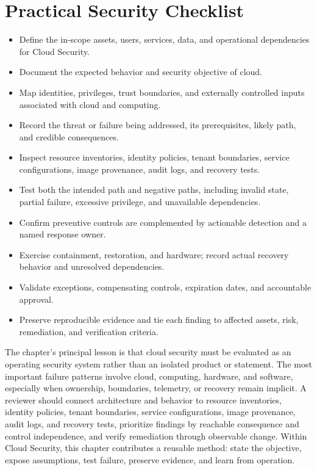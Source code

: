 \documentclass[11pt]{article}
\begin{document}
\section*{Practical Security Checklist}
\begin{itemize}[label=$\square$]
\item Define the in-scope assets, users, services, data, and operational dependencies for Cloud Security.
\item Document the expected behavior and security objective of cloud.
\item Map identities, privileges, trust boundaries, and externally controlled inputs associated with cloud and computing.
\item Record the threat or failure being addressed, its prerequisites, likely path, and credible consequences.
\item Inspect resource inventories, identity policies, tenant boundaries, service configurations, image provenance, audit logs, and recovery tests.
\item Test both the intended path and negative paths, including invalid state, partial failure, excessive privilege, and unavailable dependencies.
\item Confirm preventive controls are complemented by actionable detection and a named response owner.
\item Exercise containment, restoration, and hardware; record actual recovery behavior and unresolved dependencies.
\item Validate exceptions, compensating controls, expiration dates, and accountable approval.
\item Preserve reproducible evidence and tie each finding to affected assets, risk, remediation, and verification criteria.
\end{itemize}
\begin{synthesisbox}
The chapter's principal lesson is that cloud security must be evaluated as an operating security system rather than an isolated product or statement. The most important failure patterns involve cloud, computing, hardware, and software, especially when ownership, boundaries, telemetry, or recovery remain implicit. A reviewer should connect architecture and behavior to resource inventories, identity policies, tenant boundaries, service configurations, image provenance, audit logs, and recovery tests, prioritize findings by reachable consequence and control independence, and verify remediation through observable change. Within Cloud Security, this chapter contributes a reusable method: state the objective, expose assumptions, test failure, preserve evidence, and learn from operation.
\end{synthesisbox}
\end{document}
